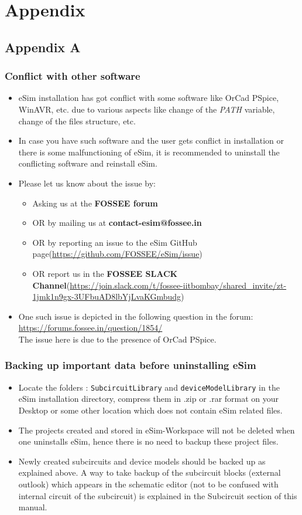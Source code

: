 \chapter{Appendix}
\section{Appendix A}
\subsection{Conflict with other software}
\begin{itemize}
    \item eSim installation has got conflict with some software like OrCad PSpice, WinAVR, etc. due to various aspects like change of the \textit{PATH} variable, change of the files structure, etc.
    \item In case you have such software and the user gets conflict in installation or there is some malfunctioning of eSim, it is recommended to uninstall the conflicting software and reinstall eSim.
    \item Please let us know about the issue by:
    \begin{itemize}
        \item Asking us at the \textbf{FOSSEE forum}
        \item OR by mailing us at \textbf{contact-esim@fossee.in}
        \item OR by reporting an issue to the eSim GitHub page(\url{https://github.com/FOSSEE/eSim/issue})
        \item OR report us in the \textbf{FOSSEE SLACK Channel}(\url{https://join.slack.com/t/fossee-iitbombay/shared_invite/zt-1jmk1n9gx-3UFbuAD8lbYjLvaKGmbudg}) 
    \end{itemize} 
    \item One such issue is depicted in the following question in the forum:
    \url{https://forums.fossee.in/question/1854/}\\
    The issue here is due to the presence of OrCad PSpice.
\end{itemize}
\subsection{Backing up important data before uninstalling eSim}
\begin{itemize}

\item Locate the folders : {\tt SubcircuitLibrary} and {\tt deviceModelLibrary} in the eSim installation directory, compress them in .zip or .rar format on your Desktop or some other location which does not contain eSim related files.
\item The projects created and stored in eSim-Workspace will not be deleted when one uninstalls eSim, hence there is no need to backup these project files. 
\item Newly created subcircuits and device models should be backed up as explained above. A way to take backup of the subcircuit blocks (external outlook) which appears in the schematic editor (not to be confused with internal circuit of the subcircuit) is explained in the Subcircuit section of this manual.
\end{itemize}
